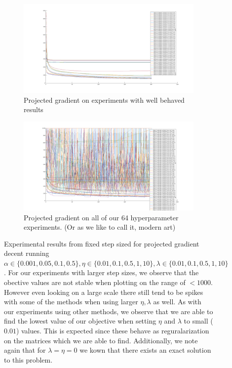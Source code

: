 \documentclass{article}
\newcommand{\0}{\mathrm{0}}
\newcommand{\1}{\mathrm{1}}
\begin{document}
\begin{figure}[H]
  \begin{subfigure}[b]{\textwidth}
    \includegraphics[width=\textwidth]{proj-gradient-fixed-wellb.png}
    \caption{Projected gradient on experiments with well behaved results}
  \end{subfigure}
  \begin{subfigure}[b]{\textwidth}
    \includegraphics[width=\textwidth]{proj-gradient-fixed-all.png}
    \caption{Projected gradient on all of our 64 hyperparameter experiments. (Or as we like to call it, modern art)}
  \end{subfigure}
  \caption{Experimental results from fixed step sized for projected gradient decent running $\alpha \in \{0.001, 0.05, 0.1, 0.5\}, \eta \in \{ 0.01, 0.1, 0.5, 1, 10 \}, \lambda \in \{ 0.01, 0.1, 0.5, 1, 10\} $.
For our experiments with larger step sizes, we observe that the obective values
are not stable when plotting on the range of $< 1000$.  However even looking on
a large scale there still tend to be spikes with some of the methods when using
larger $\eta, \lambda$ as well.  As with our experiments using other methods, we
observe that we are able to find the lowest value of our objective when setting
$\eta$ and $\lambda$ to small ($0.01$) values.  This is expected since these
behave as reguralarization on the matrices which we are able to find.
Additionally, we note again that for $\lambda = \eta = 0$ we kown that there
exists an exact solution to this problem.}
  \label{PGD_overall}
\end{figure}
\end{document}
